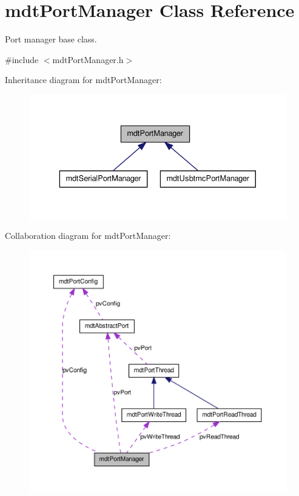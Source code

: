 \hypertarget{classmdt_port_manager}{
\section{mdtPortManager Class Reference}
\label{classmdt_port_manager}
}


Port manager base class.  




{\ttfamily \#include $<$mdtPortManager.h$>$}



Inheritance diagram for mdtPortManager:\nopagebreak
\begin{figure}[H]
\begin{center}
\leavevmode
\includegraphics[width=332pt]{classmdt_port_manager__inherit__graph}
\end{center}
\end{figure}


Collaboration diagram for mdtPortManager:\nopagebreak
\begin{figure}[H]
\begin{center}
\leavevmode
\includegraphics[width=400pt]{classmdt_port_manager__coll__graph}
\end{center}
\end{figure}

